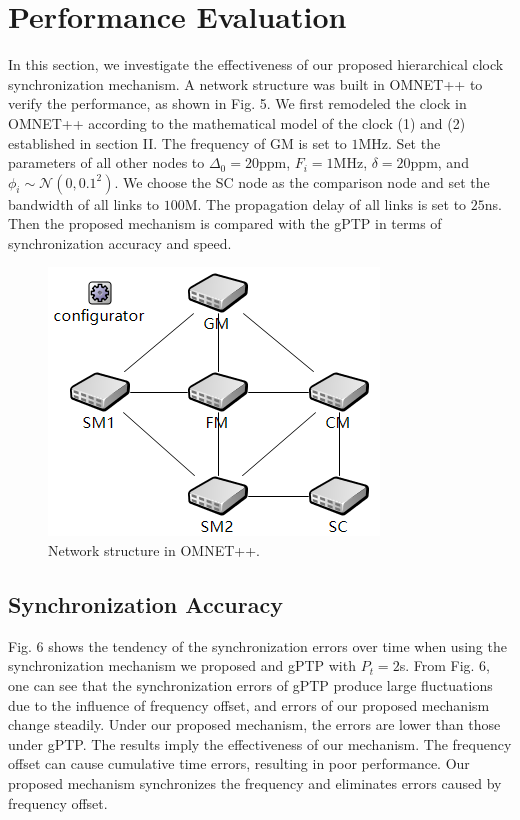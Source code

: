 \documentclass[conference]{IEEEtran}
\begin{document}

\section{Performance Evaluation}

In this section, we investigate the effectiveness of our proposed hierarchical clock synchronization mechanism. A network structure was built in OMNET++ to verify the performance, as shown in Fig. 5. We first remodeled the clock in OMNET++ according to the mathematical model of the clock (1) and (2) established in section II. The frequency of GM is set to $1$MHz. Set the parameters of all other nodes to $\Delta_0=20$ppm, $F_i=1$MHz, $\delta=20$ppm, and $\phi_i \sim \mathcal N(0,{0.1}^2)$. We choose the SC node as the comparison node and set the bandwidth of all links to $100$M. The propagation delay of all links is set to $25$ns. Then the proposed mechanism is compared with the gPTP in terms of synchronization accuracy and speed.

\begin{figure}[h]
	\centerline{\includegraphics[scale=0.8]{fig5.PNG}}
	\caption{Network structure in OMNET++.}
	\label{fig5}
\end{figure}

\subsection{Synchronization Accuracy}
Fig. 6 shows the tendency of the synchronization errors over time when using the synchronization mechanism we proposed and gPTP with $P_t=2$s. From Fig. 6, one can see that the synchronization errors of gPTP produce large fluctuations due to the influence of frequency offset, and errors of our proposed mechanism change steadily. Under our proposed mechanism, the errors are lower than those under gPTP. The results imply the effectiveness of our mechanism. The frequency offset can cause cumulative time errors, resulting in poor performance. Our proposed mechanism synchronizes the frequency and eliminates errors caused by frequency offset.
\end{document}
